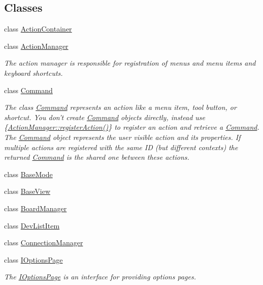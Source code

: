 \subsection*{Classes}
\begin{DoxyCompactItemize}
\item 
class \hyperlink{class_core_1_1_action_container}{Action\-Container}
\item 
class \hyperlink{class_core_1_1_action_manager}{Action\-Manager}
\begin{DoxyCompactList}\small\item\em The action manager is responsible for registration of menus and menu items and keyboard shortcuts. \end{DoxyCompactList}\item 
class \hyperlink{class_core_1_1_command}{Command}
\begin{DoxyCompactList}\small\item\em The class \hyperlink{class_core_1_1_command}{Command} represents an action like a menu item, tool button, or shortcut. You don't create \hyperlink{class_core_1_1_command}{Command} objects directly, instead use \{\hyperlink{group___core_plugin_ga316dd0cff29b294cd1b0631677f6357d}{Action\-Manager\-::register\-Action()}\} to register an action and retrieve a \hyperlink{class_core_1_1_command}{Command}. The \hyperlink{class_core_1_1_command}{Command} object represents the user visible action and its properties. If multiple actions are registered with the same I\-D (but different contexts) the returned \hyperlink{class_core_1_1_command}{Command} is the shared one between these actions. \end{DoxyCompactList}\item 
class \hyperlink{class_core_1_1_base_mode}{Base\-Mode}
\item 
class \hyperlink{class_core_1_1_base_view}{Base\-View}
\item 
class \hyperlink{class_core_1_1_board_manager}{Board\-Manager}
\item 
class \hyperlink{class_core_1_1_dev_list_item}{Dev\-List\-Item}
\item 
class \hyperlink{class_core_1_1_connection_manager}{Connection\-Manager}
\item 
class \hyperlink{class_core_1_1_i_options_page}{I\-Options\-Page}
\begin{DoxyCompactList}\small\item\em The \hyperlink{class_core_1_1_i_options_page}{I\-Options\-Page} is an interface for providing options pages. \end{DoxyCompactList}\item 

\end{DoxyCompactItemize}
